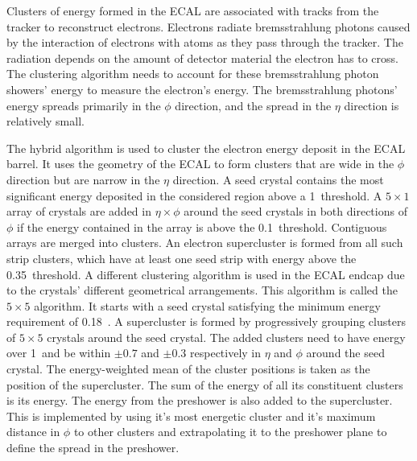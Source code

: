 Clusters of energy formed in the ECAL are associated with tracks from the tracker to reconstruct electrons. Electrons radiate bremsstrahlung photons caused by the interaction of electrons with atoms as they pass through the tracker. The radiation depends on the amount of detector material the electron has to cross. The clustering algorithm needs to account for these bremsstrahlung photon showers' energy to measure the electron's energy. The bremsstrahlung photons' energy spreads primarily in the $\phi$ direction, and the spread in the $\eta$ direction is relatively small.

The hybrid algorithm is used to cluster the electron energy deposit in the ECAL barrel. It uses the geometry of the ECAL to form clusters that are wide in the $\phi$ direction but are narrow in the $\eta$ direction. A seed crystal contains the most significant energy deposited in the considered region above a 1~\GeV threshold. A $5 \times 1$ array of crystals are added in $\eta\times\phi$ around the seed crystals in both directions of $\phi$ if the energy contained in the array is above the 0.1~\GeV threshold. Contiguous arrays are merged into clusters. An electron supercluster is formed from all such strip clusters, which have at least one seed strip with energy above the 0.35~\GeV threshold. A different clustering algorithm is used in the ECAL endcap due to the crystals' different geometrical arrangements. This algorithm is called the $5 \times 5$ algorithm. It starts with a seed crystal satisfying the minimum energy requirement of 0.18~\GeV. A supercluster is formed by progressively grouping clusters of $5 \times 5$ crystals around the seed crystal. The added clusters need to have energy over 1~\GeV and be within $\pm 0.7$  and $\pm 0.3$ respectively in $\eta$ and $\phi$ around the seed crystal. The energy-weighted mean of the cluster positions is taken as the position of the supercluster. The sum of the energy of all its constituent clusters is its energy. The energy from the preshower is also added to the supercluster. This is implemented by using it's most energetic cluster and it's maximum distance in $\phi$ to other clusters and extrapolating it to the preshower plane to define the spread in the preshower.

